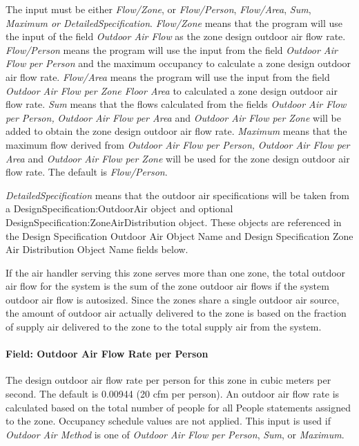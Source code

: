 The input must be either \emph{Flow/Zone}, or \emph{Flow/Person}, \emph{Flow/Area}, \emph{Sum}, \emph{Maximum or DetailedSpecification}. \emph{Flow/Zone} means that the program will use the input of the field \emph{Outdoor Air Flow} as the zone design outdoor air flow rate. \emph{Flow/Person} means the program will use the input from the field \emph{Outdoor Air Flow per Person} and the maximum occupancy to calculate a zone design outdoor air flow rate. \emph{Flow/Area} means the program will use the input from the field \emph{Outdoor Air Flow per Zone Floor Area} to calculated a zone design outdoor air flow rate. \emph{Sum} means that the flows calculated from the fields \emph{Outdoor Air Flow per Person,} \emph{Outdoor Air Flow per Area} and \emph{Outdoor Air Flow per Zone} will be added to obtain the zone design outdoor air flow rate. \emph{Maximum} means that the maximum flow derived from \emph{Outdoor Air Flow per Person,} \emph{Outdoor Air Flow per Area} and \emph{Outdoor Air Flow per Zone} will be used for the zone design outdoor air flow rate. The default is \emph{Flow/Person}.

\emph{DetailedSpecification} means that the outdoor air specifications will be taken from a DesignSpecification:OutdoorAir object and optional DesignSpecification:ZoneAirDistribution object. These objects are referenced in the Design Specification Outdoor Air Object Name and Design Specification Zone Air Distribution Object Name fields below.

If the air handler serving this zone serves more than one zone, the total outdoor air flow for the system is the sum of the zone outdoor air flows if the system outdoor air flow is autosized. Since the zones share a single outdoor air source, the amount of outdoor air actually delivered to the zone is based on the fraction of supply air delivered to the zone to the total supply air from the system.

\paragraph{Field: Outdoor Air Flow Rate per Person}\label{field-outdoor-air-flow-rate-per-person-11}

The design outdoor air flow rate per person for this zone in cubic meters per second. The default is 0.00944 (20 cfm per person). An outdoor air flow rate is calculated based on the total number of people for all People statements assigned to the zone. Occupancy schedule values are not applied. This input is used if \emph{Outdoor Air Method} is one of \emph{Outdoor Air Flow per Person}, \emph{Sum}, or \emph{Maximum}.


